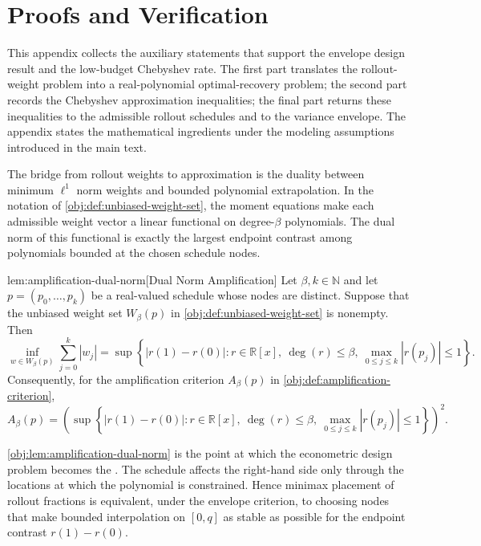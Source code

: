 \section{Proofs and Verification}

This appendix collects the auxiliary statements that support the envelope design result and the low-budget Chebyshev rate. The first part translates the rollout-weight problem into a real-polynomial optimal-recovery problem; the second part records the Chebyshev approximation inequalities; the final part returns these inequalities to the admissible rollout schedules and to the variance envelope. The appendix states the mathematical ingredients under the modeling assumptions introduced in the main text.

The bridge from rollout weights to approximation is the duality between minimum \(\ell^1\) norm weights and bounded polynomial extrapolation. In the notation of \cref{obj:def:unbiased-weight-set}, the moment equations make each admissible weight vector a linear functional on degree-\(\beta\) polynomials. The dual norm of this functional is exactly the largest endpoint contrast among polynomials bounded at the chosen schedule nodes.

\begin{lemmav}{lem:amplification-dual-norm}[Dual Norm Amplification]
Let \(\beta,k\in\mathbb N\) and let \(p=(p_0,\ldots,p_k)\) be a real-valued schedule whose nodes are distinct. Suppose that the unbiased weight set \(W_\beta(p)\) in \cref{obj:def:unbiased-weight-set} is nonempty. Then
\[
\inf_{w\in W_\beta(p)} \sum_{j=0}^k |w_j|
=
\sup\left\{
|r(1)-r(0)|:
r\in\mathbb R[x],\ \deg(r)\le \beta,\ \max_{0\le j\le k}|r(p_j)|\le 1
\right\}.
\]
Consequently, for the amplification criterion \(A_\beta(p)\) in \cref{obj:def:amplification-criterion},
\[
A_\beta(p)
=
\left(
\sup\left\{
|r(1)-r(0)|:
r\in\mathbb R[x],\ \deg(r)\le \beta,\ \max_{0\le j\le k}|r(p_j)|\le 1
\right\}
\right)^2 .
\]
\end{lemmav}

\cref{obj:lem:amplification-dual-norm} is the point at which the econometric design problem becomes the . The schedule affects the right-hand side only through the locations at which the polynomial is constrained. Hence minimax placement of rollout fractions is equivalent, under the envelope criterion, to choosing nodes that make bounded interpolation on \([0,q]\) as stable as possible for the endpoint contrast \(r(1)-r(0)\).

